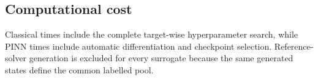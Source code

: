 \clearpage


\subsection{Computational cost}
Classical times include the complete target-wise hyperparameter search, while PINN times include automatic differentiation and checkpoint selection. Reference-solver generation is excluded for every surrogate because the same generated states define the common labelled pool.


